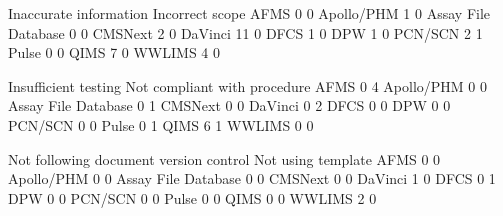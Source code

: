 \documentclass{article}
\begin{document}
\begin{Schunk}
\begin{Soutput}
                      Inaccurate information Incorrect scope
  AFMS                                     0               0
  Apollo/PHM                               1               0
  Assay File Database                      0               0
  CMSNext                                  2               0
  DaVinci                                 11               0
  DFCS                                     1               0
  DPW                                      1               0
  PCN/SCN                                  2               1
  Pulse                                    0               0
  QIMS                                     7               0
  WWLIMS                                   4               0
                     
                      Insufficient testing Not compliant with procedure
  AFMS                                   0                            4
  Apollo/PHM                             0                            0
  Assay File Database                    0                            1
  CMSNext                                0                            0
  DaVinci                                0                            2
  DFCS                                   0                            0
  DPW                                    0                            0
  PCN/SCN                                0                            0
  Pulse                                  0                            1
  QIMS                                   6                            1
  WWLIMS                                 0                            0
                     
                      Not following document version control Not using template
  AFMS                                                     0                  0
  Apollo/PHM                                               0                  0
  Assay File Database                                      0                  0
  CMSNext                                                  0                  0
  DaVinci                                                  1                  0
  DFCS                                                     0                  1
  DPW                                                      0                  0
  PCN/SCN                                                  0                  0
  Pulse                                                    0                  0
  QIMS                                                     0                  0
  WWLIMS                                                   2                  0
                     

\end{Soutput}
\end{Schunk}
\end{document}
